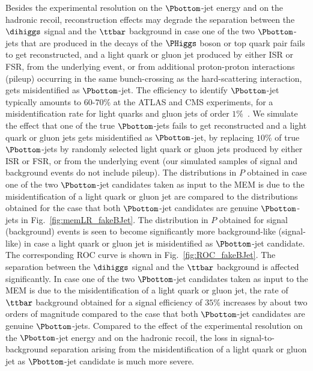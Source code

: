 Besides the experimental resolution on the $\Pbottom$-jet energy and on the hadronic recoil,
reconstruction effects may degrade the separation between the $\dihiggs$ signal and the $\ttbar$ background
in case one of the two $\Pbottom$-jets that are produced in the decays of the $\PHiggs$ boson or top quark pair
fails to get reconstructed,
and a light quark or gluon jet produced by either ISR or FSR, from the underlying event, 
or from additional proton-proton interactions (pileup) occurring in the same bunch-crossing as the hard-scattering interaction,
gets misidentified as $\Pbottom$-jet.
The efficiency to identify $\Pbottom$-jet typically amounts to $60$-$70\%$ at the ATLAS and CMS experiments,
for a misidentification rate for light quarks and gluon jets of order $1\%$~\cite{Aad:2015ydr,BTV-16-002}.
We simulate the effect that one of the true $\Pbottom$-jets fails to get reconstructed and a light quark or gluon jets gets misidentified as $\Pbottom$-jet,
by replacing $10\%$ of true $\Pbottom$-jets by randomly selected light quark or gluon jets produced by either ISR or FSR, or from the underlying event 
(our simulated samples of signal and background events do not include pileup).
The distributions in $P$ obtained in case one of the two $\Pbottom$-jet candidates taken as input to the MEM 
is due to the misidentification of a light quark or gluon jet 
are compared to the distributions obtained for the case that both $\Pbottom$-jet candidates are genuine $\Pbottom$-jets in Fig.~\ref{fig:memLR_fakeBJet}.
The distribution in $P$ obtained for signal (background) events is seen to become significantly more background-like (signal-like) 
in case a light quark or gluon jet is misidentified as $\Pbottom$-jet candidate.
The corresponding ROC curve is shown in Fig.~\ref{fig:ROC_fakeBJet}.
The separation between the $\dihiggs$ signal and the $\ttbar$ background is affected significantly.
In case one of the two $\Pbottom$-jet candidates taken as input to the MEM is due to the misidentification of a light quark or gluon jet,
the rate of $\ttbar$ background obtained for a signal efficiency of $35\%$ increases by about two orders of magnitude 
compared to the case that both $\Pbottom$-jet candidates are genuine $\Pbottom$-jets.
Compared to the effect of the experimental resolution on the $\Pbottom$-jet energy and on the hadronic recoil,
the loss in signal-to-background separation arising from the misidentification of a light quark or gluon jet as $\Pbottom$-jet candidate
is much more severe.

